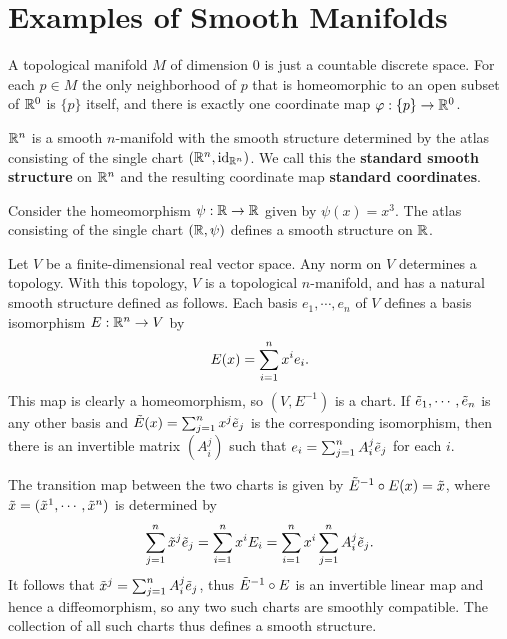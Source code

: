 \section{Examples of Smooth Manifolds}
\begin{example}
    A topological manifold $M$ of dimension $0$ is just a countable discrete space. 
    For each $p \in M$ the only neighborhood of $p$ that is homeomorphic to an open subset of $\mathbb{R}^0$ is $\{p\}$ itself, and there is exactly one coordinate map $\varphi: \{p\} \to \mathbb{R}^0$. 
\end{example}
\begin{example}
    $\mathbb{R}^n$ is a smooth $n$-manifold with the smooth structure determined by the atlas consisting of the single chart $(\mathbb{R}^n, \mathrm{id}_{\mathbb{R}^n})$. We call this the \textbf{standard smooth structure} on $\mathbb{R}^n$ and the resulting coordinate map \textbf{standard coordinates}. 
\end{example}
\begin{example}
    Consider the homeomorphism $\psi: \mathbb{R} \to \mathbb{R}$ given by $\psi(x) = x^3$.
    The atlas consisting of the single chart $(\mathbb{R},\psi)$ defines a smooth structure on $\mathbb{R}$. 
\end{example}
\begin{example}
    Let $V$ be a finite-dimensional real vector space. Any norm on $V$ determines a topology. With this topology, $V$ is a topological $n$-manifold, and has a natural smooth structure defined as follows. Each basis $e_1, \cdots, e_n$ of $V$ defines a basis isomorphism $E: \mathbb{R}^n \to V$ by 
    $$E(x) = \sum_{i=1}^{n}x^i e_i. $$
    This map is clearly a homeomorphism, so $(V, E^{-1})$ is a chart. 
    If $\Tilde{e}_1, \cdots, \Tilde{e}_n$ is any other basis and $\Tilde{E}(x) = \sum_{j=1}^{n}x^j \Tilde{e}_j$ is the corresponding isomorphism, then there is an invertible matrix $(A_i^j)$ such that $e_i = \sum_{j=1}^{n}A_i^j \Tilde{e}_j$ for each $i$. 

    The transition map between the two charts is given by $\Tilde{E}^{-1} \circ E(x) = \Tilde{x}$, where $\Tilde{x} = (\Tilde{x}^1, \cdots, \Tilde{x}^n)$ is determined by
    $$\sum_{j=1}^{n}\Tilde{x}^j \Tilde{e}_j = \sum_{i=1}^{n}x^i E_i = \sum_{i=1}^{n} x^i \sum_{j=1}^{n}A_i^j \Tilde{e}_j.$$
    It follows that $\Tilde{x}^j = \sum_{j=1}^{n}A_i^j \Tilde{e}_j$, thus $\Tilde{E}^{-1} \circ E$ is an invertible linear map and hence a diffeomorphism, so any two such charts are smoothly compatible. The collection of all such charts thus defines a smooth structure. 
\end{example}

